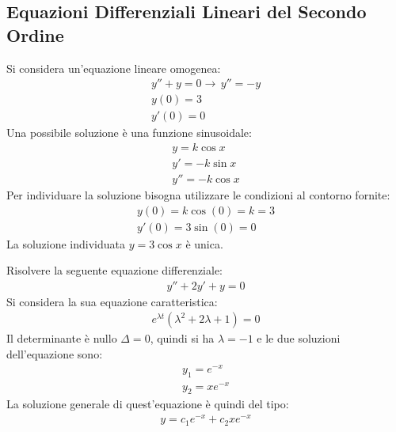 \documentclass{article}
\numberwithin{equation}{subsection}
\begin{document}
\subsection{Equazioni Differenziali Lineari del Secondo Ordine}


Si considera un'equazione lineare omogenea:
\begin{gather*}
    y''+y=0\to\,y''=-y\\
    y(0)=3\\
    y'(0)=0
\end{gather*}
Una possibile soluzione è una funzione sinusoidale:
\begin{gather*}
    y=k\cos x\\
    y'=-k\sin x\\
    y''=-k\cos x
\end{gather*}
Per individuare la soluzione bisogna utilizzare le condizioni al contorno fornite:
\begin{gather*}
    y(0)=k\cos(0)=k=3\\
    y'(0)=3\sin(0)=0
\end{gather*}
La soluzione individuata $y=3\cos x$ è unica. 



Risolvere la seguente equazione differenziale:
\begin{gather*}
    y''+2y'+y=0
\end{gather*}
Si considera la sua equazione caratteristica:
\begin{gather*}
    e^{\lambda t}(\lambda^2+2\lambda+1)=0
\end{gather*}
Il determinante è nullo $\Delta=0$, quindi si ha $\lambda=-1$ e le due soluzioni dell'equazione sono:
\begin{gather*}
    y_1=e^{-x}\\
    y_2=xe^{-x}
\end{gather*}
La soluzione generale di quest'equazione è quindi del tipo:
\begin{gather*}
    y=c_1e^{-x}+c_2xe^{-x}
\end{gather*}
\end{document}
